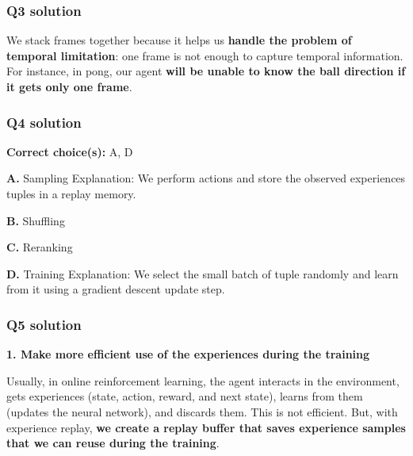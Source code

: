 \documentclass[11pt,a4paper]{article}
\begin{document}
\subsubsection{Q3 solution}\label{q3-solution}

We stack frames together because it helps us \textbf{handle the problem of temporal limitation}: one frame is not enough to capture temporal information. For instance, in pong, our agent \textbf{will be unable to know the ball direction if it gets only one frame}.



\subsubsection{Q4 solution}\label{q4-solution}

\textbf{Correct choice(s):} A, D

\textbf{A.} Sampling Explanation: We perform actions and store the observed experiences tuples in a replay memory.

\textbf{B.} Shuffling

\textbf{C.} Reranking

\textbf{D.} Training Explanation: We select the small batch of tuple randomly and learn from it using a gradient descent update step.

\subsubsection{Q5 solution}\label{q5-solution}

\textbf{1. Make more efficient use of the experiences during the training}

Usually, in online reinforcement learning, the agent interacts in the environment, gets experiences (state, action, reward, and next state), learns from them (updates the neural network), and discards them. This is not efficient. But, with experience replay, \textbf{we create a replay buffer that saves experience samples that we can reuse during the training}.
\end{document}
